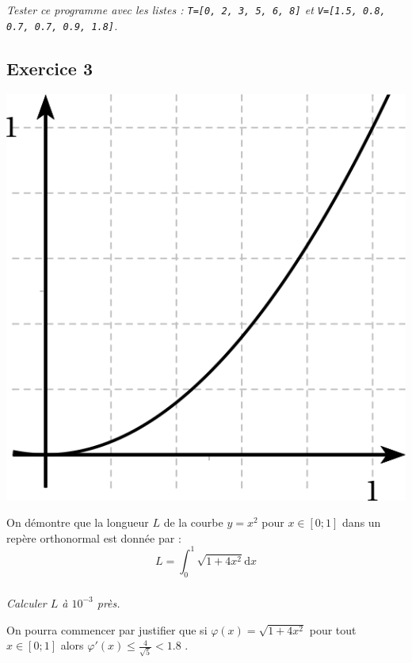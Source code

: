 \documentclass[10pt,oneside]{article}
\begin{document}
\subparagraph{}
\textit{Tester ce programme avec les listes : \texttt{T=[0, 2, 3, 5, 6, 8]} et \texttt{V=[1.5, 0.8, 0.7, 0.7, 0.9, 1.8]}.}


\subsection*{Exercice 3}
\setcounter{subparagraph}{0}


\begin{minipage}{4cm}
\includegraphics[width=\textwidth]{images/courbe}
\end{minipage}
\hfill
\begin{minipage}{12cm}
On démontre que la longueur $L$ de la courbe $y=x^2$ pour $x\in[0;1]$ dans un repère orthonormal est donnée par :
$$L=\int_0^1\sqrt{1+4x^2}\text{d}x$$

\subparagraph*{}\textit{Calculer $L$ à $10^{-3}$ près.}

\medskip

On pourra commencer par justifier que si $\varphi(x)=\sqrt{1+4x^2}$ pour tout $x\in[0;1]$ alors $\varphi'(x)\leq\frac{4}{\sqrt{5}}<1.8$ .
\end{minipage}\hfill\hbox{}
\end{document}
